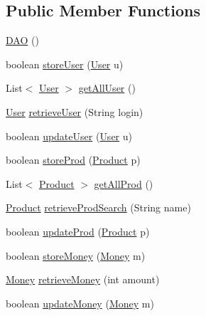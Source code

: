 \subsection*{Public Member Functions}
\begin{DoxyCompactItemize}
\item 
\hyperlink{classes_1_1deusto_1_1server_1_1db_1_1dao_1_1_d_a_o_a1f12a4ca454651d41896e45c42db8f90}{D\+AO} ()
\item 
boolean \hyperlink{classes_1_1deusto_1_1server_1_1db_1_1dao_1_1_d_a_o_acb146e96959c340ef828ef8e36b4283c}{store\+User} (\hyperlink{classes_1_1deusto_1_1server_1_1db_1_1data_1_1_user}{User} u)
\item 
List$<$ \hyperlink{classes_1_1deusto_1_1server_1_1db_1_1data_1_1_user}{User} $>$ \hyperlink{classes_1_1deusto_1_1server_1_1db_1_1dao_1_1_d_a_o_a0ee6fd52276091b7e40129d1c484ef14}{get\+All\+User} ()
\item 
\hyperlink{classes_1_1deusto_1_1server_1_1db_1_1data_1_1_user}{User} \hyperlink{classes_1_1deusto_1_1server_1_1db_1_1dao_1_1_d_a_o_a8c316b4c3bf246d00fb2b423a603ebe6}{retrieve\+User} (String login)
\item 
boolean \hyperlink{classes_1_1deusto_1_1server_1_1db_1_1dao_1_1_d_a_o_a7f6ed77294fe1f61cbebbea410cef6e0}{update\+User} (\hyperlink{classes_1_1deusto_1_1server_1_1db_1_1data_1_1_user}{User} u)
\item 
boolean \hyperlink{classes_1_1deusto_1_1server_1_1db_1_1dao_1_1_d_a_o_a345f30d95426e1cc8bd845949978dd1c}{store\+Prod} (\hyperlink{classes_1_1deusto_1_1server_1_1db_1_1data_1_1_product}{Product} p)
\item 
List$<$ \hyperlink{classes_1_1deusto_1_1server_1_1db_1_1data_1_1_product}{Product} $>$ \hyperlink{classes_1_1deusto_1_1server_1_1db_1_1dao_1_1_d_a_o_a589bc944971075e694d9dc8eabf76870}{get\+All\+Prod} ()
\item 
\hyperlink{classes_1_1deusto_1_1server_1_1db_1_1data_1_1_product}{Product} \hyperlink{classes_1_1deusto_1_1server_1_1db_1_1dao_1_1_d_a_o_a5b4aa30073fdf9ea4263a86165ed4c18}{retrieve\+Prod\+Search} (String name)
\item 
boolean \hyperlink{classes_1_1deusto_1_1server_1_1db_1_1dao_1_1_d_a_o_a2a7817f0def3d19a7871910ebba76df7}{update\+Prod} (\hyperlink{classes_1_1deusto_1_1server_1_1db_1_1data_1_1_product}{Product} p)
\item 
boolean \hyperlink{classes_1_1deusto_1_1server_1_1db_1_1dao_1_1_d_a_o_a0cfb218b648ebc99aed950614173b6c6}{store\+Money} (\hyperlink{classes_1_1deusto_1_1server_1_1db_1_1data_1_1_money}{Money} m)
\item 
\hyperlink{classes_1_1deusto_1_1server_1_1db_1_1data_1_1_money}{Money} \hyperlink{classes_1_1deusto_1_1server_1_1db_1_1dao_1_1_d_a_o_a171a709ad2008e5eea8a77db494df1d0}{retrieve\+Money} (int amount)
\item 
boolean \hyperlink{classes_1_1deusto_1_1server_1_1db_1_1dao_1_1_d_a_o_a05c7fc41d49e5ab7f0830405ccf60c87}{update\+Money} (\hyperlink{classes_1_1deusto_1_1server_1_1db_1_1data_1_1_money}{Money} m)
\end{DoxyCompactItemize}


